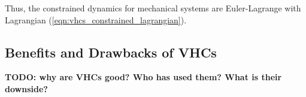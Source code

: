 Thus, the constrained dynamics for mechanical systems are Euler-Lagrange with
Lagrangian (\ref{eqn:vhcs_constrained_lagrangian}).

\subsection{Benefits and Drawbacks of VHCs}
\textbf{TODO: why are VHCs good? Who has used them? What is their downside?}

